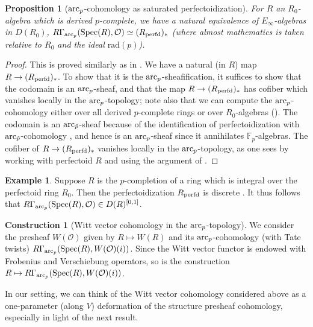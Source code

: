 \documentclass{amsart}
\newtheorem{proposition}[theorem]{Proposition}
\theoremstyle{definition}
\newtheorem{construction}[theorem]{Construction}
\newcommand{\spec}{\mathrm{Spec}}
\newtheorem{example}[theorem]{Example}
\begin{document}
\begin{proposition}[$\mathrm{arc}_{{p}}$-cohomology as saturated perfectoidization] 
For $R$ an $R_0$-algebra which is derived $p$-complete, we have a natural
equivalence 
of $E_\infty$-algebras
in $D(R_0)$,
$R \Gamma_{\arc}( \spec(R), \mathcal{O}) \simeq  (R_{\pf})_*$ (where almost
mathematics is taken relative to $R_0$ and the ideal $\mathrm{rad}(p)$). 
\end{proposition} 
\begin{proof} 
This is proved similarly as in 
. 
We have a natural (in $R$) map 
$R \to (R_{\mathrm{perfd}})_*$. To show that it is the $\mathrm{arc}_{{p}}$-sheafification, it suffices
to show that 
the codomain is an $\mathrm{arc}_{{p}}$-sheaf, and that 
the map $R \to (R_{\mathrm{perfd}})_*$ has cofiber which vanishes locally in the
$\mathrm{arc}_{{p}}$-topology; note also that we can compute the $\mathrm{arc}_{{p}}$-cohomology either
over all derived $p$-complete rings or over $R_0$-algebras (). 
The codomain is an $\mathrm{arc}_{\hat{p}}$-sheaf because of 
the identification of perfectoidization with $\mathrm{arc}_{\hat{p}}$-cohomology
\cite[Sec.~8]{Prisms}, and hence is an
$\mathrm{arc}_{{p}}$-sheaf since it annihilates $\mathbb{F}_p$-algebras. The 
cofiber of $R \to (R_{\mathrm{perfd}})_*$ vanishes locally in the $\mathrm{arc}_{{p}}$-topology, as one
sees by  
working with perfectoid $R$ and using the argument of . 
\end{proof} 

\begin{example} 
\label{integralexample}
Suppose $R$ is  the $p$-completion of a ring
which is integral over the perfectoid ring $R_0$. 
Then the perfectoidization $R_{\mathrm{perfd}}$ is discrete \cite[Th.~10.11]{Prisms}. 
It thus follows that 
$R\Gamma_{\arc}( \spec(R), \mathcal{O}) \in D(R)^{[0, 1]}$. 
\end{example} 


\begin{construction}[Witt vector cohomology in the $\mathrm{arc}_{{p}}$-topology] 
We consider the presheaf $W(\mathcal{O})$ given by $R \mapsto W(R)$ 
and its $\mathrm{arc}_{{p}}$-cohomology (with Tate twists) $R \Gamma_{\arc}(\spec(R), W(\mathcal{O})(i))$. 
Since the Witt vector functor is 
endowed with Frobenius and Verschiebung operators, so is 
the construction
$R \mapsto R \Gamma_{\arc}(\spec(R), W(\mathcal{O})(i))$. 
\end{construction} 

In our setting, we can think of the Witt vector cohomology considered above as a one-parameter
(along $V$) deformation
of the structure presheaf cohomology, especially in light of the next result. 
\end{document}
